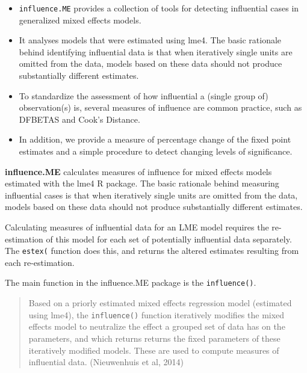 \documentclass{article}
\begin{document}
\begin{itemize}
\item \texttt{influence.ME} provides a collection of tools for
detecting influential cases in generalized mixed effects
models. 

\item It analyses models that were estimated using lme4. The
basic rationale behind identifying influential data is that
when iteratively single units are omitted from the data, models
based on these data should not produce substantially different
estimates. 

\item To standardize the assessment of how influential a
(single group of) observation(s) is, several measures of
influence are common practice, such as DFBETAS and Cook's Distance.

\item In addition, we provide a measure of percentage change of the fixed point
estimates and a simple procedure to detect changing levels of significance.
\end{itemize}

\textbf{influence.ME} calculates measures of influence for mixed effects models estimated with the lme4 R package. The
basic rationale behind measuring influential cases is that when iteratively single units are omitted
from the data, models based on these data should not produce substantially different estimates. 

Calculating measures of influential data for an LME model requires the re-estimation
of this model for each set of potentially influential data separately. The \texttt{estex(} function does this,
and returns the altered estimates resulting from each re-estimation. 

The main function in the influence.ME package is the \texttt{influence()}.

\begin{quote} Based on a priorly estimated
mixed effects regression model (estimated using lme4), the \texttt{influence()} function iteratively modifies
the mixed effects model to neutralize the effect a grouped set of data has on the parameters, and
which returns returns the fixed parameters of these iteratively modified models. These are used to
compute measures of influential data. (Nieuwenhuis et al, 2014)
\end{quote}
\end{document}
